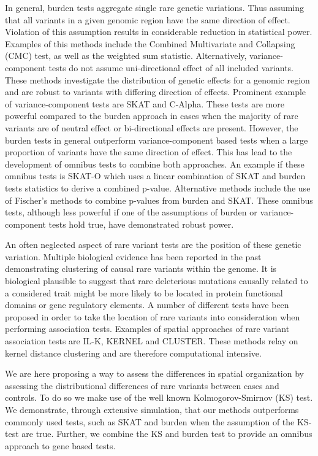In general, burden tests aggregate single rare genetic variations.
Thus assuming that all variants in a given genomic region have the same direction of effect.
Violation of this assumption results in considerable reduction in statistical power.
Examples of this methods include the Combined Multivariate and Collapsing (CMC) test\cite{Li2008}, as well as the weighted sum statistic\cite{Madsen2009}.
Alternatively, variance-component tests do not assume uni-directional effect of all included variants. 
These methods investigate the distribution of genetic effects for a genomic region and are robust to variants with differing direction of effects.
Prominent example of variance-component tests are SKAT\cite{Wu2011} and C-Alpha\cite{Neale2011}.
These tests are more powerful compared to the burden approach in cases when the majority of rare variants are of neutral effect or bi-directional effects are present.
However, the burden tests in general outperform variance-component based tests when a large proportion of variants have the same direction of effect.
This has lead to the development of omnibus tests to combine both approaches.
An example if these omnibus tests is SKAT-O\cite{Lee2012a} which uses a linear combination of SKAT and burden tests statistics to derive a combined p-value.
Alternative methods include the use of Fischer's methods to combine p-values from burden and SKAT\cite{Derkach2013a}.
These omnibus tests, although less powerful if one of the assumptions of burden or variance-component tests hold true, have demonstrated robust power\cite{Lee2014}. 

An often neglected aspect of rare variant tests are the position of these genetic variation.
Multiple biological evidence has been reported in the past demonstrating clustering of causal rare variants within the genome\cite{Ionita-Laza2012}.%
It is biological plausible to suggest that rare deleterious mutations causally related to a considered trait might be more likely to be located in protein functional domains or gene regulatory elements. %
A number of different tests have been proposed in order to take the location of rare variants into consideration when performing association tests.
Examples of spatial approaches of rare variant association tests are IL-K\cite{Ionita-Laza2012}, KERNEL\cite{Schaid2013} and CLUSTER\cite{Lin2014}.
These methods relay on kernel distance clustering and are therefore computational intensive. %

We are here proposing a way to assess the differences in spatial organization by assessing the distributional differences of rare variants between cases and controls.
To do so we make use of the well known Kolmogorov-Smirnov (KS) test.
We demonstrate, through extensive simulation, that our methods outperforms commonly used tests, such as SKAT and burden when the assumption of the KS-test are true.
Further, we combine the KS and burden test to provide an omnibus approach to gene based tests.
